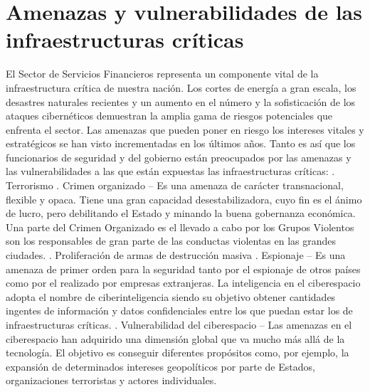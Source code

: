 \documentclass{article}
\begin{document}
\section{Amenazas y vulnerabilidades de las infraestructuras críticas}
El Sector de Servicios Financieros representa un componente vital de la infraestructura crítica de nuestra nación. Los cortes de energía a gran escala, los desastres naturales recientes y un aumento en el número y la sofisticación de los ataques cibernéticos demuestran la amplia gama de riesgos potenciales que enfrenta el sector.
Las amenazas que pueden poner en riesgo los intereses vitales y estratégicos se han visto incrementadas en los últimos años. Tanto es así que los funcionarios de seguridad y del gobierno están preocupados por las amenazas y las vulnerabilidades a las que están expuestas las infraestructuras críticas:
\newline
{}. Terrorismo
\newline
{}. Crimen organizado – Es una amenaza de carácter transnacional, flexible y opaca. Tiene una gran capacidad desestabilizadora, cuyo fin es el ánimo de lucro, pero debilitando el Estado y minando la buena gobernanza económica. Una parte del Crimen Organizado es el llevado a cabo por los Grupos Violentos son los responsables de gran parte de las conductas violentas en las grandes ciudades. 
\newline
{}. Proliferación de armas de destrucción masiva
\newline
{}. Espionaje – Es una amenaza de primer orden para la seguridad tanto por el espionaje de otros países como por el realizado por empresas extranjeras. La inteligencia en el ciberespacio adopta el nombre de ciberinteligencia siendo su objetivo obtener cantidades ingentes de información y datos confidenciales entre los que puedan estar los de infraestructuras críticas.
\newline
{}. Vulnerabilidad del ciberespacio – Las amenazas en el ciberespacio han adquirido una dimensión global que va mucho más allá de la tecnología. El objetivo es conseguir diferentes propósitos como, por ejemplo, la expansión de determinados intereses geopolíticos por parte de Estados, organizaciones terroristas y actores individuales. 
\newline
\newline
\end{document}
